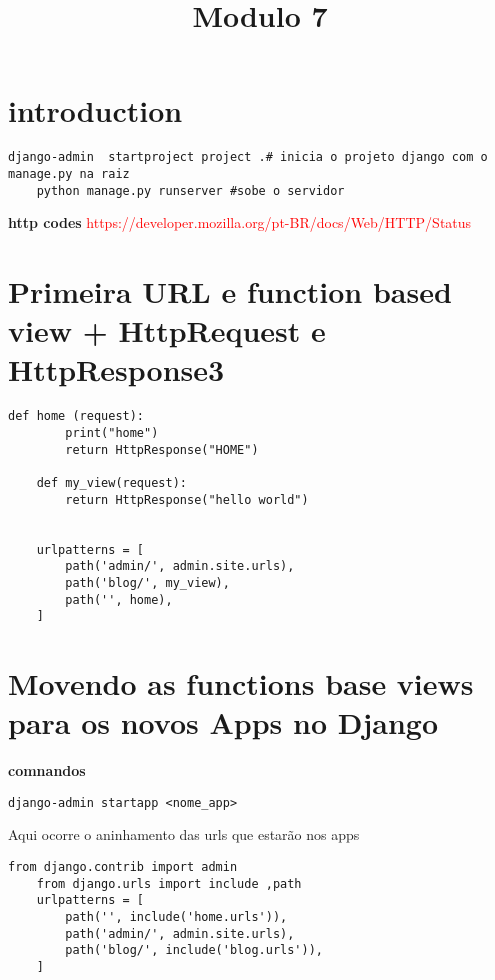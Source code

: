 \documentclass{article}
\date{} %
\title{Modulo 7}
\begin{document}
\maketitle
\tableofcontents
\section{introduction}
\begin{lstlisting}[style=pythonStyle, caption={comandos django}]
    django-admin  startproject project .# inicia o projeto django com o manage.py na raiz
    python manage.py runserver #sobe o servidor
\end{lstlisting}
\textbf{http codes}
\textcolor{red}{https://developer.mozilla.org/pt-BR/docs/Web/HTTP/Status}

\section{
    Primeira URL e function based view + HttpRequest e HttpResponse3
    }

\begin{lstlisting}[style=pythonStyle, caption={urls.py}]
    def home (request):
        print("home")
        return HttpResponse("HOME")

    def my_view(request):
        return HttpResponse("hello world")


    urlpatterns = [
        path('admin/', admin.site.urls),
        path('blog/', my_view),
        path('', home),
    ]
\end{lstlisting}

\section{Movendo as functions base views para os novos Apps no Django}
\textbf{comnandos}
\begin{lstlisting}[style=pythonStyle, caption={comando django}] 
django-admin startapp <nome_app> \end{lstlisting}

Aqui ocorre o aninhamento das urls que estarão nos apps
\begin{lstlisting}[style=pythonStyle, caption={project/urls.py}]
    from django.contrib import admin
    from django.urls import include ,path
    urlpatterns = [
        path('', include('home.urls')),
        path('admin/', admin.site.urls),
        path('blog/', include('blog.urls')),
    ]
\end{lstlisting}
\end{document}
